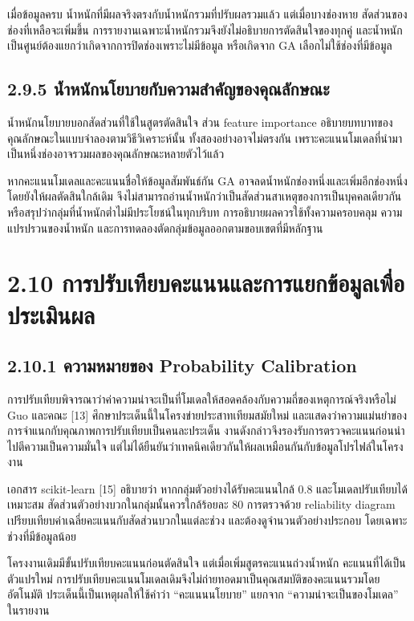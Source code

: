 \documentclass[12pt,a4paper]{report}
\begin{document}
เมื่อข้อมูลครบ น้ำหนักที่มีผลจริงตรงกับน้ำหนักรวมที่ปรับผลรวมแล้ว แต่เมื่อบางช่องหาย สัดส่วนของช่องที่เหลือจะเพิ่มขึ้น การรายงานเฉพาะน้ำหนักรวมจึงยังไม่อธิบายการตัดสินใจของทุกคู่ และน้ำหนักเป็นศูนย์ต้องแยกว่าเกิดจากการปิดช่องเพราะไม่มีข้อมูล หรือเกิดจาก GA เลือกไม่ใช้ช่องที่มีข้อมูล

\subsection*{2.9.5 น้ำหนักนโยบายกับความสำคัญของคุณลักษณะ}
น้ำหนักนโยบายบอกสัดส่วนที่ใช้ในสูตรตัดสินใจ ส่วน feature importance อธิบายบทบาทของคุณลักษณะในแบบจำลองตามวิธีวิเคราะห์นั้น ทั้งสองอย่างอาจไม่ตรงกัน เพราะคะแนนโมเดลที่นำมาเป็นหนึ่งช่องอาจรวมผลของคุณลักษณะหลายตัวไว้แล้ว

หากคะแนนโมเดลและคะแนนชื่อให้ข้อมูลสัมพันธ์กัน GA อาจลดน้ำหนักช่องหนึ่งและเพิ่มอีกช่องหนึ่งโดยยังให้ผลตัดสินใกล้เดิม จึงไม่สามารถอ่านน้ำหนักว่าเป็นสัดส่วนสาเหตุของการเป็นบุคคลเดียวกัน หรือสรุปว่ากลุ่มที่น้ำหนักต่ำไม่มีประโยชน์ในทุกบริบท การอธิบายผลควรใช้ทั้งความครอบคลุม ความแปรปรวนของน้ำหนัก และการทดลองตัดกลุ่มข้อมูลออกตามขอบเขตที่มีหลักฐาน

\section*{2.10 การปรับเทียบคะแนนและการแยกข้อมูลเพื่อประเมินผล}
\subsection*{2.10.1 ความหมายของ Probability Calibration}
การปรับเทียบพิจารณาว่าค่าความน่าจะเป็นที่โมเดลให้สอดคล้องกับความถี่ของเหตุการณ์จริงหรือไม่ Guo และคณะ [13] ศึกษาประเด็นนี้ในโครงข่ายประสาทเทียมสมัยใหม่ และแสดงว่าความแม่นยำของการจำแนกกับคุณภาพการปรับเทียบเป็นคนละประเด็น งานดังกล่าวจึงรองรับการตรวจคะแนนก่อนนำไปตีความเป็นความมั่นใจ แต่ไม่ได้ยืนยันว่าเทคนิคเดียวกันให้ผลเหมือนกันกับข้อมูลโปรไฟล์ในโครงงาน

เอกสาร scikit-learn [15] อธิบายว่า หากกลุ่มตัวอย่างได้รับคะแนนใกล้ 0.8 และโมเดลปรับเทียบได้เหมาะสม สัดส่วนตัวอย่างบวกในกลุ่มนั้นควรใกล้ร้อยละ 80 การตรวจด้วย reliability diagram เปรียบเทียบค่าเฉลี่ยคะแนนกับสัดส่วนบวกในแต่ละช่วง และต้องดูจำนวนตัวอย่างประกอบ โดยเฉพาะช่วงที่มีข้อมูลน้อย

โครงงานเดิมมีขั้นปรับเทียบคะแนนก่อนตัดสินใจ แต่เมื่อเพิ่มสูตรคะแนนถ่วงน้ำหนัก คะแนนที่ได้เป็นตัวแปรใหม่ การปรับเทียบคะแนนโมเดลเดิมจึงไม่ถ่ายทอดมาเป็นคุณสมบัติของคะแนนรวมโดยอัตโนมัติ ประเด็นนี้เป็นเหตุผลให้ใช้คำว่า ``คะแนนนโยบาย'' แยกจาก ``ความน่าจะเป็นของโมเดล'' ในรายงาน
\end{document}
